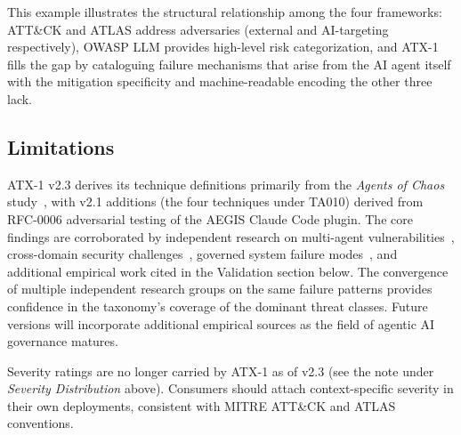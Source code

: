 \documentclass{IEEEoj-data}
\newcommand{\replaced}[2]{#1}
\newcommand{\added}[1]{#1}
\newcommand{\deleted}[1]{}
\begin{document}
\added{This example illustrates the structural relationship among the four frameworks: ATT\&CK and ATLAS address adversaries (external and AI-targeting respectively), OWASP LLM provides high-level risk categorization, and ATX-1 fills the gap by cataloguing failure mechanisms that arise from the AI agent itself with the mitigation specificity and machine-readable encoding the other three lack.}

\subsection*{Limitations}

\replaced{ATX-1 v2.3 derives its technique definitions primarily from the {\it Agents of Chaos} study~\mbox{\cite{ref4}}, with v2.1 additions (the four techniques under TA010) derived from RFC-0006 adversarial testing of the AEGIS Claude Code plugin. The core findings are corroborated by independent research on multi-agent vulnerabilities~\mbox{\cite{ref11}}, cross-domain security challenges~\mbox{\cite{ref12}}, governed system failure modes~\mbox{\cite{ref13}}, and additional empirical work cited in the Validation section below. The convergence of multiple independent research groups on the same failure patterns provides confidence in the taxonomy's coverage of the dominant threat classes}{ATX-1 v1.0 derives its technique definitions primarily from the {\it Agents of Chaos} study~\mbox{\cite{ref4}}, with the core findings corroborated by independent research on multi-agent vulnerabilities~\mbox{\cite{ref11}}, cross-domain security challenges~\mbox{\cite{ref12}}, and governed system failure modes~\mbox{\cite{ref13}}. While the technique catalog may not be exhaustive, the convergence of multiple research groups on the same failure patterns provides confidence in the taxonomy's coverage of the dominant threat classes}. Future versions will incorporate additional empirical sources as the field of agentic AI governance matures.

\deleted{The severity ratings reflect the author's assessment based on the documented case studies and are not derived from a quantitative risk model. Organizations should calibrate severity ratings to their specific deployment context.}

\added{Severity ratings are no longer carried by ATX-1 as of v2.3 (see the note under \textit{Severity Distribution} above). Consumers should attach context-specific severity in their own deployments, consistent with MITRE ATT\&CK and ATLAS conventions.}
\end{document}
